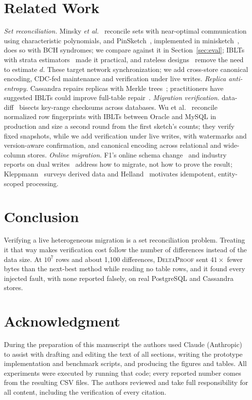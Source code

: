 \documentclass[conference]{IEEEtran}
\newcommand{\sys}{\textsc{DeltaProof}}
\begin{document}
\section{Related Work}
\emph{Set reconciliation.} Minsky \emph{et al.}~\cite{minsky2003} reconcile sets with near-optimal communication using characteristic polynomials, and PinSketch~\cite{dodis2008}, implemented in minisketch~\cite{minisketch}, does so with BCH syndromes; we compare against it in Section~\ref{sec:eval}; IBLTs~\cite{goodrich2011} with strata estimators~\cite{eppstein2011} made it practical, and rateless designs~\cite{yang2024} remove the need to estimate $d$. These target network synchronization; we add cross-store canonical encoding, CDC-fed maintenance and verification under live writes. \emph{Replica anti-entropy.} Cassandra repairs replicas with Merkle trees~\cite{lakshman2010,merkle1987}; practitioners have suggested IBLTs could improve full-table repair~\cite{scylla2026}. \emph{Migration verification.} data-diff~\cite{datadiff} bisects key-range checksums across databases. Wu et al.~\cite{wu2026} reconcile normalized row fingerprints with IBLTs between Oracle and MySQL in production and size a second round from the first sketch's counts; they verify fixed snapshots, while we add verification under live writes, with watermarks and version-aware confirmation, and canonical encoding across relational and wide-column stores. \emph{Online migration.} F1's online schema change~\cite{rae2013} and industry reports on dual writes~\cite{xu2017} address how to migrate, not how to prove the result; Kleppmann~\cite{kleppmann2017} surveys derived data and Helland~\cite{helland2007} motivates idempotent, entity-scoped processing.

\section{Conclusion}
Verifying a live heterogeneous migration is a set reconciliation problem. Treating it that way makes verification cost follow the number of differences instead of the data size. At $10^7$ rows and about 1{,}100 differences, \sys{} sent $41\times$ fewer bytes than the next-best method while reading no table rows, and it found every injected fault, with none reported falsely, on real PostgreSQL and Cassandra stores.

\section*{Acknowledgment}
During the preparation of this manuscript the authors used Claude (Anthropic) to assist with drafting and editing the text of all sections, writing the prototype implementation and benchmark scripts, and producing the figures and tables. All experiments were executed by running that code; every reported number comes from the resulting CSV files. The authors reviewed and take full responsibility for all content, including the verification of every citation.
\end{document}
